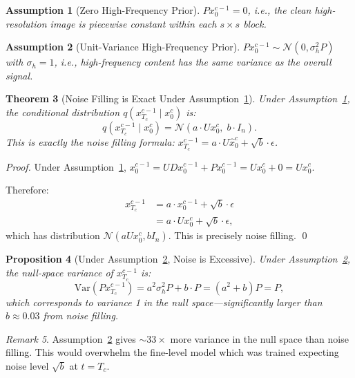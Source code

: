 \documentclass[11pt]{article}
\newtheorem{theorem}{Theorem}[section]
\newtheorem{proposition}[theorem]{Proposition}
\newtheorem{assumption}[theorem]{Assumption}
\theoremstyle{remark}
\newtheorem{remark}[theorem]{Remark}
\begin{document}
\begin{assumption}[Zero High-Frequency Prior]\label{assm:zero}
$Px_0^{c-1} = 0$, i.e., the clean high-resolution image is piecewise constant within each $s \times s$ block.
\end{assumption}

\begin{assumption}[Unit-Variance High-Frequency Prior]\label{assm:unit}
$Px_0^{c-1} \sim \mathcal{N}(0, \sigma_h^2 P)$ with $\sigma_h = 1$, i.e., high-frequency content has the same variance as the overall signal.
\end{assumption}

\begin{theorem}[Noise Filling is Exact Under Assumption~\ref{assm:zero}]\label{thm:main}
Under Assumption~\ref{assm:zero}, the conditional distribution $q(x_{T_c}^{c-1} \mid x_0^c)$ is:
\begin{equation}
    q(x_{T_c}^{c-1} \mid x_0^c) = \mathcal{N}\!\left(a \cdot U x_0^c,\; b \cdot I_n\right).
\end{equation}
This is exactly the noise filling formula: $x_{T_c}^{c-1} = a \cdot U\hat{x}_0^c + \sqrt{b} \cdot \epsilon$.
\end{theorem}

\begin{proof}
Under Assumption~\ref{assm:zero}, $x_0^{c-1} = UDx_0^{c-1} + Px_0^{c-1} = Ux_0^c + 0 = Ux_0^c$.

Therefore:
\begin{align*}
    x_{T_c}^{c-1} &= a \cdot x_0^{c-1} + \sqrt{b} \cdot \epsilon \\
    &= a \cdot Ux_0^c + \sqrt{b} \cdot \epsilon,
\end{align*}
which has distribution $\mathcal{N}(aUx_0^c, bI_n)$. This is precisely noise filling. \qed
\end{proof}

\begin{proposition}[Under Assumption~\ref{assm:unit}, Noise is Excessive]\label{prop:excess}
Under Assumption~\ref{assm:unit}, the null-space variance of $x_{T_c}^{c-1}$ is:
\begin{equation}
    \mathrm{Var}(Px_{T_c}^{c-1}) = a^2 \sigma_h^2 P + b \cdot P = (a^2 + b)P = P,
\end{equation}
which corresponds to variance 1 in the null space---significantly larger than $b \approx 0.03$ from noise filling.
\end{proposition}

\begin{remark}
Assumption~\ref{assm:unit} gives $\sim 33\times$ more variance in the null space than noise filling. This would overwhelm the fine-level model which was trained expecting noise level $\sqrt{b}$ at $t = T_c$.
\end{remark}
\end{document}

